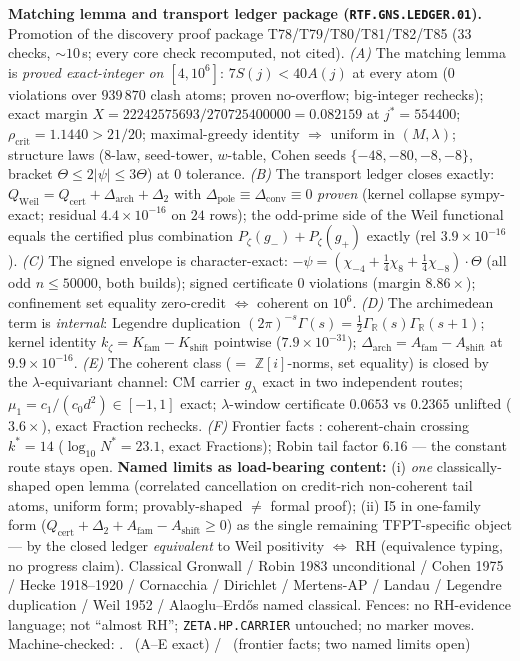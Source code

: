 \documentclass[11pt,a4paper]{article}
\newcommand{\Z}{\mathbb Z}
\begin{document}
\par\smallskip\noindent\textbf{Matching lemma and transport ledger package
(\texttt{RTF.GNS.LEDGER.01}).}
Promotion of the discovery proof package T78/T79/T80/T81/T82/T85 ($33$ checks,
$\sim10$\,s; every core check recomputed, not cited).
\emph{(A)} The matching lemma is \emph{proved exact-integer on $[4,10^6]$}:
$7S(j)<40A(j)$ at every atom ($0$ violations over $939\,870$ clash atoms;
proven no-overflow; big-integer rechecks); exact margin
$X=22242575693/270725400000=0.082159$ at $j^*=554400$;
$\rho_{\mathrm{crit}}=1.1440>21/20$; maximal-greedy identity $\Rightarrow$
uniform in $(M,\lambda)$; structure laws ($8$-law, seed-tower, $w$-table,
Cohen seeds $\{-48,-80,-8,-8\}$, bracket $\Theta\le2|\psi|\le3\Theta$) at $0$
tolerance.
\emph{(B)} The transport ledger closes exactly:
$Q_{\mathrm{Weil}}=Q_{\mathrm{cert}}+\Delta_{\mathrm{arch}}+\Delta_2$ with
$\Delta_{\mathrm{pole}}\equiv\Delta_{\mathrm{conv}}\equiv0$ \emph{proven}
(kernel collapse sympy-exact; residual $4.4\times10^{-16}$ on $24$ rows); the
odd-prime side of the Weil functional equals the certified plus combination
$P_\zeta(g_-)+P_\zeta(g_+)$ exactly (rel $3.9\times10^{-16}$).
\emph{(C)} The signed envelope is character-exact:
$-\psi=(\chi_{-4}+\tfrac14\chi_8+\tfrac14\chi_{-8})\cdot\Theta$ (all odd
$n\le50000$, both builds); signed certificate $0$ violations (margin
$8.86\times$); confinement set equality zero-credit $\Leftrightarrow$
coherent on $10^6$.
\emph{(D)} The archimedean term is \emph{internal}: Legendre duplication
$(2\pi)^{-s}\Gamma(s)=\tfrac12\Gamma_{\mathbb R}(s)\Gamma_{\mathbb R}(s{+}1)$;
kernel identity $k_\zeta=K_{\mathrm{fam}}-K_{\mathrm{shift}}$ pointwise
($7.9\times10^{-31}$);
$\Delta_{\mathrm{arch}}=A_{\mathrm{fam}}-A_{\mathrm{shift}}$ at
$9.9\times10^{-16}$.
\emph{(E)} The coherent class ($=$ $\Z[i]$-norms, set equality) is closed by
the $\lambda$-equivariant channel: CM carrier $g_\lambda$ exact in two
independent routes; $\mu_1=c_1/(c_0d^2)\in[-1,1]$ exact; $\lambda$-window
certificate $0.0653$ vs $0.2365$ unlifted ($3.6\times$), exact Fraction
rechecks.
\emph{(F)} Frontier facts \mC: coherent-chain crossing $k^*=14$
($\log_{10}N^*=23.1$, exact Fractions); Robin tail factor $6.16$ --- the
constant route stays open.
\textbf{Named limits as load-bearing content:} (i) \emph{one}
classically-shaped open lemma (correlated cancellation on credit-rich
non-coherent tail atoms, uniform form; provably-shaped $\neq$ formal proof);
(ii) I5 in one-family form
($Q_{\mathrm{cert}}+\Delta_2+A_{\mathrm{fam}}-A_{\mathrm{shift}}\ge0$) as the
single remaining TFPT-specific object --- by the closed ledger
\emph{equivalent} to Weil positivity $\Longleftrightarrow$ RH (equivalence
typing, no progress claim). Classical Gronwall / Robin 1983 unconditional /
Cohen 1975 / Hecke 1918--1920 / Cornacchia / Dirichlet / Mertens-AP / Landau /
Legendre duplication / Weil 1952 / Alaoglu--Erd\H{o}s named classical.
Fences: no RH-evidence language; not ``almost RH'';
\texttt{ZETA.HP.CARRIER} untouched; no marker moves.
Machine-checked: .
\mE\ (A--E exact) / \mC\ (frontier facts; two named limits open)
\end{document}
